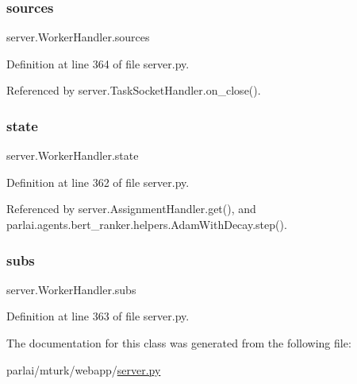 \mbox{\label{classserver_1_1WorkerHandler_a9c1392c52e51d6697273645bada48ac3}} 
\subsubsection{\texorpdfstring{sources}{sources}}
{\footnotesize\ttfamily server.\+Worker\+Handler.\+sources}



Definition at line 364 of file server.\+py.



Referenced by server.\+Task\+Socket\+Handler.\+on\+\_\+close().

\mbox{\label{classserver_1_1WorkerHandler_a89716a189e35063d081d77b89b2b4013}} 
\subsubsection{\texorpdfstring{state}{state}}
{\footnotesize\ttfamily server.\+Worker\+Handler.\+state}



Definition at line 362 of file server.\+py.



Referenced by server.\+Assignment\+Handler.\+get(), and parlai.\+agents.\+bert\+\_\+ranker.\+helpers.\+Adam\+With\+Decay.\+step().

\mbox{\label{classserver_1_1WorkerHandler_ac0c164cd91b7ed4a21d81f1908c2d099}} 
\subsubsection{\texorpdfstring{subs}{subs}}
{\footnotesize\ttfamily server.\+Worker\+Handler.\+subs}



Definition at line 363 of file server.\+py.



The documentation for this class was generated from the following file\+:\begin{DoxyCompactItemize}
\item 
parlai/mturk/webapp/\hyperlink{server_8py}{server.\+py}\end{DoxyCompactItemize}
